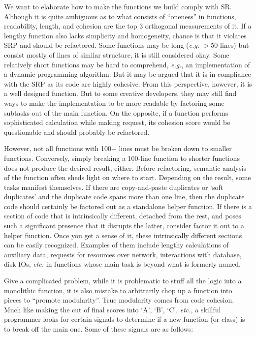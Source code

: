 We want to elaborate how to make the functions we build comply with SR\@.
Although it is quite ambiguous as to what consists of ``oneness'' in functions,
readability, length, and cohesion are the top $3$  orthogonal measurements of it.
If a lengthy function also lacks simplicity and homogeneity,
chance is that it violates SRP and should be refactored.
Some functions may be long (\textit{e.g.} $> 50$ lines) but consist mostly of lines of similar
structure, it is still considered okay.
Some relatively short functions may be hard to comprehend, \textit{e.g.}, an implementation of
a dynamic programming algorithm.
But it may be argued that it is in compliance with the SRP as its code are highly cohesive.
From this perspective, however, it is a well designed function.
But to some creative developers, they may still find ways to make the implementation to be more
readable by factoring some subtasks out of the main function.
On the opposite, if a function performs sophisticated calculation while making
 request, its cohesion score would be questionable and should probably be refactored.


However, not all functions with 100+ lines must be broken down to smaller functions.
Conversely, simply breaking a 100-line function to shorter functions does not
produce the desired result, either.
Before refactoring, semantic analysis of the function often sheds light on where to start.
Depending on the result, some tasks manifest themselves.
If there are copy-and-paste duplicates or `soft duplicates' and the duplicate code spans more
than one line, then the duplicate code should certainly
be factored out as a standalone helper function.
If there is a section of code that is intrinsically different, detached from the rest, and poses
such a significant presence that it disrupts the latter,
consider factor it out to a helper function.
Once you get a sense of it, these intrinsically different sections can be easily recognized.
Examples of them include lengthy calculations of auxiliary data,
requests for resources over network, interactions with database, disk IOs, \textit{etc.} in
functions whose main task is beyond what is formerly named.


Give a complicated problem, while it is problematic to stuff all the logic into a monolithic
function,
it is also mistake to arbitrarily chop up a function into pieces to ``promote modularity''.
True modularity comes from code cohesion.
Much like making the cut of final scores into `A', `B', `C', \textit{etc.}, a skillful programmer
looks for certain signals to determine if a new function (or class) is to break off the main one.
Some of these signals are as follows:

